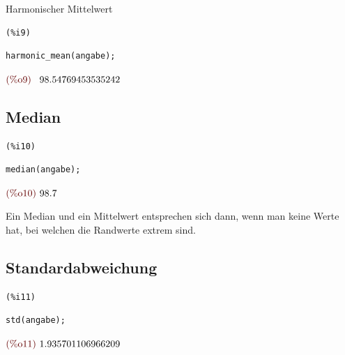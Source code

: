 \documentclass{article}
\begin{document}
Harmonischer Mittelwert

\noindent
\begin{minipage}[t]{8ex}{\color{red}\bf
\begin{verbatim}
(%i9) 
\end{verbatim}}
\end{minipage}
\begin{minipage}[t]{\textwidth}{\color{blue}
\begin{verbatim}
harmonic_mean(angabe);
\end{verbatim}}
\end{minipage}
\begin{math}\displaystyle
\parbox{8ex}{\color{labelcolor}(\%o9) }
98.54769453535242
\end{math}


\subsection{Median}



\noindent
\begin{minipage}[t]{8ex}{\color{red}\bf
\begin{verbatim}
(%i10) 
\end{verbatim}}
\end{minipage}
\begin{minipage}[t]{\textwidth}{\color{blue}
\begin{verbatim}
median(angabe);
\end{verbatim}}
\end{minipage}
\begin{math}\displaystyle
\parbox{8ex}{\color{labelcolor}(\%o10) }
98.7
\end{math}

Ein Median und ein Mittelwert entsprechen sich dann, wenn man keine Werte hat, bei welchen die Randwerte extrem sind.

\subsection{Standardabweichung}



\noindent
\begin{minipage}[t]{8ex}{\color{red}\bf
\begin{verbatim}
(%i11) 
\end{verbatim}}
\end{minipage}
\begin{minipage}[t]{\textwidth}{\color{blue}
\begin{verbatim}
std(angabe);
\end{verbatim}}
\end{minipage}
\begin{math}\displaystyle
\parbox{8ex}{\color{labelcolor}(\%o11) }
1.935701106966209
\end{math}
\end{document}
